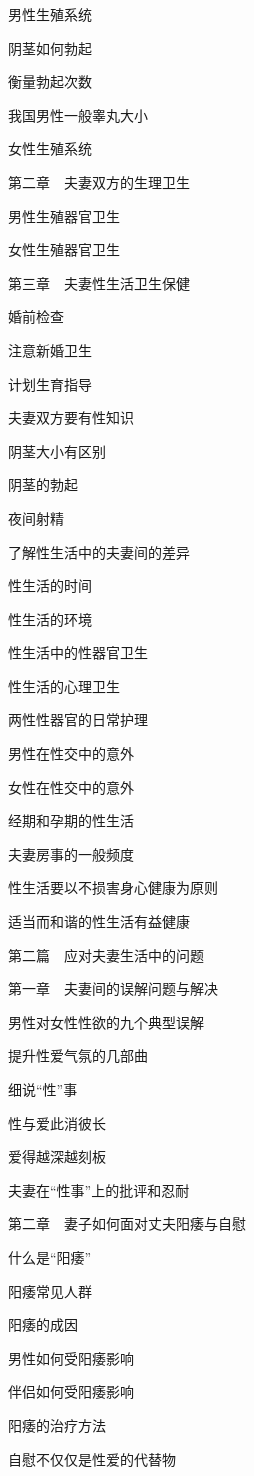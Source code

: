 \documentclass[12pt,UTF8]{ctexbook}
\begin{document}
男性生殖系统

阴茎如何勃起

衡量勃起次数

我国男性一般睾丸大小

女性生殖系统

第二章　夫妻双方的生理卫生

男性生殖器官卫生

女性生殖器官卫生

第三章　夫妻性生活卫生保健

婚前检查

注意新婚卫生

计划生育指导

夫妻双方要有性知识

阴茎大小有区别

阴茎的勃起

夜间射精

了解性生活中的夫妻间的差异

性生活的时间

性生活的环境

性生活中的性器官卫生

性生活的心理卫生

两性性器官的日常护理

男性在性交中的意外

女性在性交中的意外

经期和孕期的性生活

夫妻房事的一般频度

性生活要以不损害身心健康为原则

适当而和谐的性生活有益健康

第二篇　应对夫妻生活中的问题

第一章　夫妻间的误解问题与解决

男性对女性性欲的九个典型误解

提升性爱气氛的几部曲

细说“性”事

性与爱此消彼长

爱得越深越刻板

夫妻在“性事”上的批评和忍耐

第二章　妻子如何面对丈夫阳痿与自慰

什么是“阳痿”

阳痿常见人群

阳痿的成因

男性如何受阳痿影响

伴侣如何受阳痿影响

阳痿的治疗方法

自慰不仅仅是性爱的代替物
\end{document}
